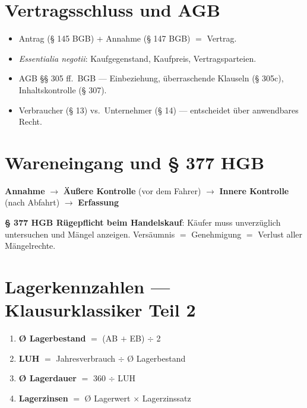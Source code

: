 \documentclass[11pt, a4paper]{article}
\begin{document}
\section{Vertragsschluss und AGB}

\begin{itemize}[itemsep=2pt]
  \item Antrag (§ 145 BGB) + Annahme (§ 147 BGB) $=$ Vertrag.
  \item \emph{Essentialia negotii}: Kaufgegenstand, Kaufpreis, Vertragsparteien.
  \item AGB §§ 305 ff.\ BGB --- Einbeziehung, überraschende Klauseln (§ 305c), Inhaltskontrolle (§ 307).
  \item Verbraucher (§ 13) vs.\ Unternehmer (§ 14) --- entscheidet über anwendbares Recht.
\end{itemize}

\section{Wareneingang und § 377 HGB}

\begin{merksatz}[title={Wareneingang in 4 Schritten}]
\textbf{Annahme} $\to$ \textbf{Äußere Kontrolle} (vor dem Fahrer) $\to$ \textbf{Innere Kontrolle} (nach Abfahrt) $\to$ \textbf{Erfassung}
\end{merksatz}

\textbf{§ 377 HGB Rügepflicht beim Handelskauf}: Käufer muss unverzüglich
untersuchen und Mängel anzeigen. Versäumnis $=$ Genehmigung $=$ Verlust aller
Mängelrechte.

\section{Lagerkennzahlen --- Klausurklassiker Teil 2}

\begin{merksatz}[title={Die vier Formeln}]
\begin{enumerate}[itemsep=0pt]
  \item \textbf{Ø Lagerbestand} $=$ (AB $+$ EB) $\div$ 2
  \item \textbf{LUH} $=$ Jahresverbrauch $\div$ Ø Lagerbestand
  \item \textbf{Ø Lagerdauer} $=$ 360 $\div$ LUH
  \item \textbf{Lagerzinsen} $=$ Ø Lagerwert $\times$ Lagerzinssatz
\end{enumerate}
\end{merksatz}
\end{document}
